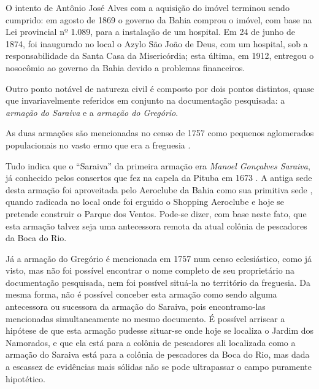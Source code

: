 O intento de Antônio José Alves com a aquisição do imóvel terminou sendo cumprido: em agosto de 1869 o governo da Bahia comprou o imóvel, com base na Lei provincial nº 1.089, para a instalação de um hospital. Em 24 de junho de 1874, foi inaugurado no local o Azylo São João de Deus, com um hospital, sob a responsabilidade da Santa Casa da Misericórdia; esta última, em 1912, entregou o nosocômio ao governo da Bahia devido a problemas financeiros.

Outro ponto notável de natureza civil é composto por dois pontos distintos, quase que invariavelmente referidos em conjunto na documentação pesquisada: a \textit{armação do Saraiva} e a \textit{armação do Gregório}.

As duas armações são mencionadas no censo de 1757 como pequenos aglomerados populacionais no vasto ermo que era a freguesia \cite[p.~183]{castralmeida_ultramar_1908}.

Tudo indica que o ``Saraiva'' da primeira armação era \textit{Manoel Gonçalves Saraiva}, já conhecido pelos consertos que fez na capela da Pituba em 1673 \cite[p.~11]{ott_engenhos_1996}. A antiga sede desta armação foi aproveitada pelo Aeroclube da Bahia como sua primitiva sede \cite[p.~III-11, verso]{teixeira_doacoes_1978}, quando radicada no local onde foi erguido o Shopping Aeroclube e hoje se pretende construir o Parque dos Ventos. Pode-se dizer, com base neste fato, que esta armação talvez seja uma antecessora remota da atual colônia de pescadores da Boca do Rio.

Já a armação do Gregório é mencionada em 1757 num censo eclesiástico, como já visto, mas não foi possível encontrar o nome completo de seu proprietário na documentação pesquisada, nem foi possível situá-la no território da freguesia. Da mesma forma, não é possível conceber esta armação como sendo alguma antecessora ou sucessora da armação do Saraiva, pois encontramo-las mencionadas simultaneamente no mesmo documento. É possível arriscar a hipótese de que esta armação pudesse situar-se onde hoje se localiza o Jardim dos Namorados, e que ela está para a colônia de pescadores ali localizada como a armação do Saraiva está para a colônia de pescadores da Boca do Rio, mas dada a escassez de evidências mais sólidas não se pode ultrapassar o campo puramente hipotético.